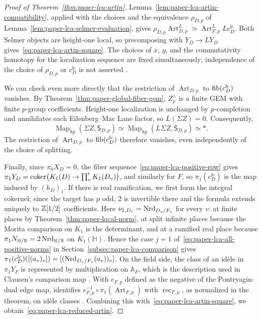 \begin{proof}[Proof of Theorem~\ref{thm:paper-lca-artin}]
Lemma~\ref{lem:paper-lca-artin-compatibility}, applied with the choices and the equivalence $\rho_{D,p}$ of Lemma~\ref{lem:paper-lca-selmer-evaluation}, gives $\rho_{D,p}\operatorname{Art}_{D,p}^{L}\simeq\operatorname{Art}_{F,p}^{L}Lc^{\mathrm{lc}}_D$.
Both Selmer objects are height-one local, so precomposing with $Y_D\to LY_D$ gives~\eqref{eq:paper-lca-artin-square}.
The choices of $x$, $y$, and the commutativity homotopy for the localization sequence are fixed simultaneously; independence of the choice of $\rho_{D,p}$ or $c^{\mathrm{lc}}_D$ is not asserted \cite[Definition 4.2 and Remarks 4.3--4.4]{ClausenArtin}.

We can check even more directly that the restriction of $\operatorname{Art}_{D,p}$ to $\operatorname{fib}(c^{\mathrm{lc}}_D)$ vanishes.
By Theorem~\ref{thm:paper-global-fiber-gem}, $Z^\wedge_p$ is a finite GEM with finite $p$-group coefficients.
Height-one localization is unchanged by $p$-completion and annihilates each Eilenberg--Mac Lane factor, so $L(\Sigma Z)=0$.
Consequently,
\[
 \operatorname{Map}_{\mathrm{Sp}}(\Sigma Z,\mathsf S_{D,p})
 \simeq
 \operatorname{Map}_{\mathrm{Sp}}(L\Sigma Z,\mathsf S_{D,p})
 \simeq *.
\]
The restriction of $\operatorname{Art}_{D,p}$ to $\operatorname{fib}(c^{\mathrm{lc}}_D)$ therefore vanishes, even independently of the choice of splitting.

Finally, since $\pi_0X_D=0$, the fiber sequence~\eqref{eq:paper-lca-positive-row} gives $\pi_1Y_D=\operatorname{coker}\bigl(K_1(D)\to\prod'_vK_1(D_v)\bigr)$, and similarly for $F$, so $\pi_1(c^{\mathrm{lc}}_D)$ is the map induced by $(h_D)_1$.
If there is real ramification, we first form the integral cokernel; since the target has $p$ odd, $2$ is invertible there and the formula extends uniquely to $\mathbb Z[1/2]$ coefficients.
Here $\nu_{1,D_v}=\operatorname{Nrd}_{D_v/F_v}$ for every $v$: at finite places by Theorem~\ref{thm:paper-local-norm}, at split infinite places because the Morita comparison on $K_1$ is the determinant, and at a ramified real place because $\pi_1N_{\mathbb H/\mathbb R}=2\operatorname{Nrd}_{\mathbb H/\mathbb R}$ on $K_1(\mathbb H)$.
Hence the case $j=1$ of~\eqref{eq:paper-lca-all-positive-norms} in Section~\ref{subsec:paper-lca-comparison} gives $\pi_1(c^{\mathrm{lc}}_D)([(a_v)_v])=[(\operatorname{Nrd}_{D_v/F_v}(a_v))_v]$.
On the field side, the class of an id\`ele in $\pi_1Y_F$ is represented by multiplication on $\mathbb A_F$, which is the description used in Clausen's comparison map \cite[Proposition 3.28(1) and Corollary 3.29(1)]{ClausenArtin}.
With $e_{F,p}$ defined as the negative of the Pontryagin-dual edge map, \cite[Theorem 0.9]{ClausenArtin} identifies $e_{F,p}^{-1}\circ\pi_1(\operatorname{Art}_{F,p})$ with $\operatorname{rec}_{F,p}$, as normalized in the theorem, on id\`ele classes \cite[Definition 2.37 and Lemma 4.5]{ClausenArtin}.
Combining this with~\eqref{eq:paper-lca-artin-square}, we obtain~\eqref{eq:paper-lca-reduced-artin}.
\end{proof}
